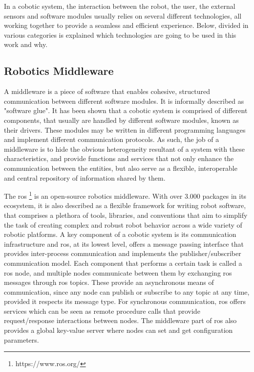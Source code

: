 \par In a cobotic system, the interaction between the robot, the user, the external sensors and software modules usually relies on several different technologies, all working together to provide a seamless and efficient experience. Below, divided in various categories is explained which technologies are going to be used in this work and why. 

\subsection{Robotics Middleware}

\par A middleware is a piece of software that enables cohesive, structured communication between different software modules. It is informally described as "software glue". It has been shown that a cobotic system is comprised of different components, that usually are handled by different software modules, known as their drivers. These modules may be written in different programming languages and implement different communication protocols. As such, the job of a middleware is to hide the obvious heterogeneity resultant of a system with these characteristics, and provide functions and services that not only enhance the communication between the entities, but also serve as a flexible, interoperable and central repository of information shared by them.
\par The \ac{ros} \footnote{https://www.ros.org/} \cite{ros} is an open-source robotics middleware. With over 3.000 packages in its ecosystem, it is also described as a flexible framework for writing robot software, that comprises a plethora of tools, libraries, and conventions that aim to simplify the task of creating complex and robust robot behavior across a wide variety of robotic platforms. A key component of a cobotic system is its communication infrastructure and \ac{ros}, at its lowest level, offers a message passing interface that provides inter-process communication and implements the publisher/subscriber communication model. Each component that performs a certain task is called a \ac{ros} node, and multiple nodes communicate between them by exchanging \ac{ros} messages through \ac{ros} topics. These provide an asynchronous means of communication, since any node can publish or subscribe to any topic at any time, provided it respects its message type. For synchronous communication, \ac{ros} offers services which can be seen as remote procedure calls that provide request/response interactions between nodes. The middleware part of \ac{ros} also provides a global key-value server where nodes can set and get configuration parameters.
